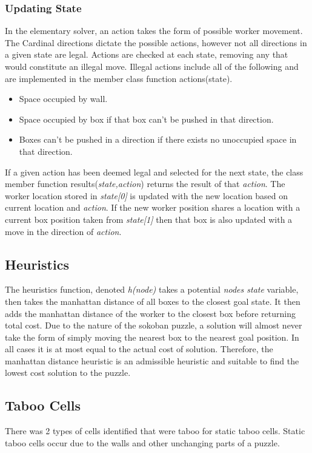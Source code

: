 \documentclass[]{article}
\begin{document}
\subsubsection{Updating State}
In the elementary solver, an action takes the form of possible worker movement. The Cardinal directions dictate the possible actions, however not all directions in a given state are legal. Actions are checked at each state, removing any that would constitute an illegal move. Illegal actions include all of the following and are implemented in the member class function actions(state).
\begin{itemize}
	\item Space occupied by wall.
	\item Space occupied by box if that box can't be pushed in that direction.
	\item Boxes can't be pushed in a direction if there exists no unoccupied space in that direction.
\end{itemize}
If a given action has been deemed legal and selected for the next state, the class member function results(\textit{state,action}) returns the result of that \textit{action}. The worker location stored in \textit{state[0]} is updated with the new location based on current location and \textit{action}. If the new worker position shares a location with a current box position taken from \textit{state[1]} then that box is also updated with a move in the direction of \textit{action}.
\subsection{Heuristics}
The heuristics function, denoted \textit{h(node)} takes a potential \textit{nodes state} variable, then takes the manhattan distance of all boxes to the closest goal state. It then adds the manhattan distance of the worker to the closest box before returning total cost. Due to the nature of the sokoban puzzle, a solution will almost never take the form of simply moving the nearest box to the nearest goal position. In all cases it is at most equal to the actual cost of solution. Therefore, the manhattan distance heuristic is an admissible heuristic and suitable to find the lowest cost solution to the puzzle. 
\subsection{Taboo Cells}
There was 2 types of cells identified that were taboo for static taboo cells. Static taboo cells occur due to the walls and other unchanging parts of a puzzle.
\end{document}
